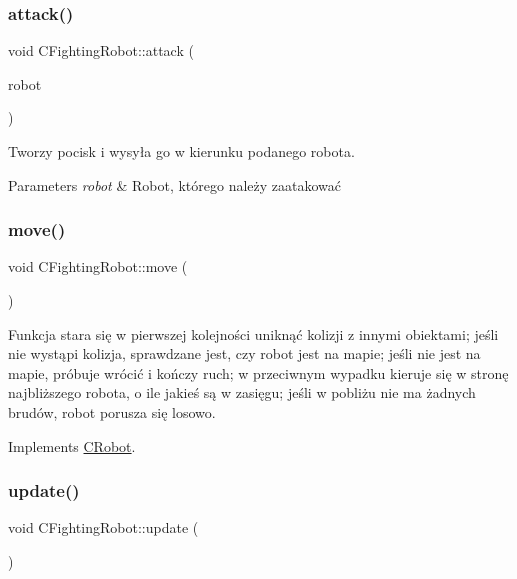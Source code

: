 \subsubsection{\texorpdfstring{attack()}{attack()}}
{\footnotesize\ttfamily void C\+Fighting\+Robot\+::attack (\begin{DoxyParamCaption}\item[{\mbox{\hyperlink{class_c_robot}{C\+Robot}} $\ast$}]{robot }\end{DoxyParamCaption})}



Tworzy pocisk i wysyła go w kierunku podanego robota. 


\begin{DoxyParams}{Parameters}
{\em robot} & Robot, którego należy zaatakować \\
\hline
\end{DoxyParams}
\mbox{\label{class_c_fighting_robot_af644acbba178e256566e9dbd230aa4db}} 
\subsubsection{\texorpdfstring{move()}{move()}}
{\footnotesize\ttfamily void C\+Fighting\+Robot\+::move (\begin{DoxyParamCaption}{ }\end{DoxyParamCaption})\hspace{0.3cm}{\ttfamily [virtual]}}



Funkcja stara się w pierwszej kolejności uniknąć kolizji z innymi obiektami; jeśli nie wystąpi kolizja, sprawdzane jest, czy robot jest na mapie; jeśli nie jest na mapie, próbuje wrócić i kończy ruch; w przeciwnym wypadku kieruje się w stronę najbliższego robota, o ile jakieś są w zasięgu; jeśli w pobliżu nie ma żadnych brudów, robot porusza się losowo. 



Implements \mbox{\hyperlink{class_c_robot_a1de9be879213eadf7ded27caedb84598}{C\+Robot}}.

\mbox{\label{class_c_fighting_robot_a3ae0ea383f809766e53c81348a07daaa}} 
\subsubsection{\texorpdfstring{update()}{update()}}
{\footnotesize\ttfamily void C\+Fighting\+Robot\+::update (\begin{DoxyParamCaption}{ }\end{DoxyParamCaption})\hspace{0.3cm}{\ttfamily [virtual]}}



